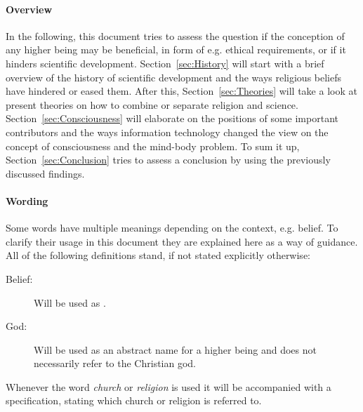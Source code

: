 \paragraph{Overview}
In the following, this document tries to assess the question if the conception of any higher being may be beneficial, in form of e.g. ethical requirements, or if it hinders scientific development.
Section~\ref{sec:History} will start with a brief overview of the history of scientific development and the ways religious beliefs have hindered or eased them.
After this, Section~\ref{sec:Theories} will take a look at present theories on how to combine or separate religion and science.
Section~\ref{sec:Consciousness} will elaborate on the positions of some important contributors and the ways information technology changed the view on the concept of consciousness and the mind-body problem.
To sum it up, Section~\ref{sec:Conclusion} tries to assess a conclusion by using the previously discussed findings.

\paragraph{Wording}
Some words have multiple meanings depending on the context, e.g. belief.
To clarify their usage in this document they are explained here as a way of guidance.
All of the following definitions stand, if not stated explicitly otherwise:
\begin{description}
    \item[Belief:] Will be used as .
    \item[God:] Will be used as an abstract name for a higher being and does not necessarily refer to the Christian god.
\end{description}
Whenever the word \emph{church} or \emph{religion} is used it will be accompanied with a specification, stating which church or religion is referred to.